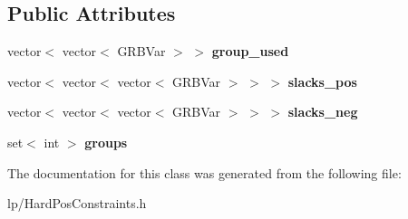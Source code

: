 \subsection*{Public Attributes}
\begin{DoxyCompactItemize}
\item 
\hypertarget{classHardPosConstraintsLP_a16ba65107e587a8cb43cc10949b0ebcf}{
vector$<$ vector$<$ GRBVar $>$ $>$ {\bfseries group\_\-used}}
\label{classHardPosConstraintsLP_a16ba65107e587a8cb43cc10949b0ebcf}

\item 
\hypertarget{classHardPosConstraintsLP_ad3b98e9e78140b02098420c674fcbaab}{
vector$<$ vector$<$ vector$<$ GRBVar $>$ $>$ $>$ {\bfseries slacks\_\-pos}}
\label{classHardPosConstraintsLP_ad3b98e9e78140b02098420c674fcbaab}

\item 
\hypertarget{classHardPosConstraintsLP_ac758c0971f82ef892f7f708db15bf472}{
vector$<$ vector$<$ vector$<$ GRBVar $>$ $>$ $>$ {\bfseries slacks\_\-neg}}
\label{classHardPosConstraintsLP_ac758c0971f82ef892f7f708db15bf472}

\item 
\hypertarget{classHardPosConstraintsLP_aa5c46efababe8dd5282a71ceb233c548}{
set$<$ int $>$ {\bfseries groups}}
\label{classHardPosConstraintsLP_aa5c46efababe8dd5282a71ceb233c548}

\end{DoxyCompactItemize}


The documentation for this class was generated from the following file:\begin{DoxyCompactItemize}
\item 
lp/HardPosConstraints.h\end{DoxyCompactItemize}
